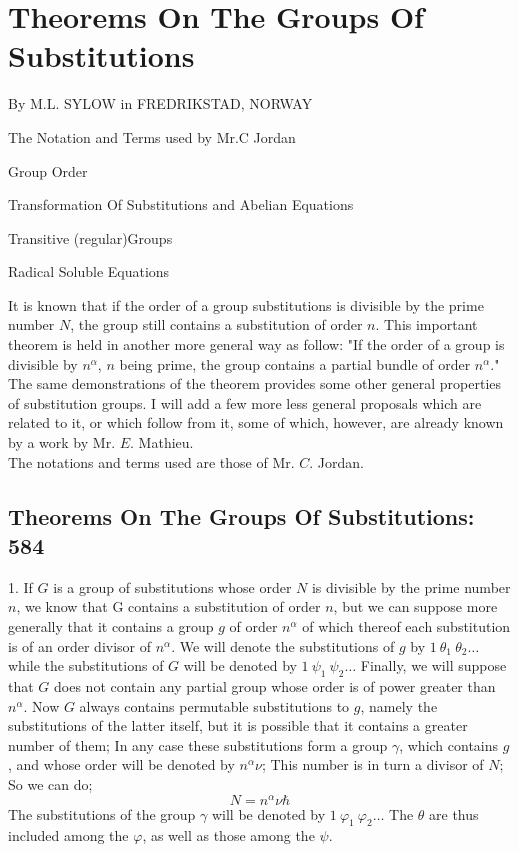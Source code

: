 \documentclass[11pt,fancy]{elegantbook}
\begin{document}
\chapter{Theorems On The Groups Of Substitutions}

\begin{introduction}
\item By M.L. SYLOW in FREDRIKSTAD, NORWAY
\item The Notation and Terms used by Mr.C Jordan
\item Group Order
\item Transformation Of Substitutions and Abelian Equations
\item Transitive (regular)Groups
\item Radical Soluble Equations
\end{introduction}

It is known that if the order of a group substitutions is divisible by the prime number $N$, the group still contains a substitution of order $n$. This important theorem is held in another more general way as follow: "If the order of a group is divisible by ${n^\alpha}$, $n$ being prime, the group contains a partial bundle of order $n^\alpha$." The same demonstrations of the theorem provides some other general properties of substitution groups. I will add a few more less general proposals which are related to it, or which follow from it, some of which, however, are already known by a work by Mr. $E$. Mathieu. \\
The notations and terms used are those of Mr. $C$. Jordan.

\section{Theorems On The Groups Of Substitutions: 584}

1. 
If $G$ is a group of substitutions whose order $N$ is divisible by the prime number $n$, we know that G contains a substitution of order $n$, but we can suppose more generally that it contains a group $g$ of order $n^\alpha$ of which thereof each substitution is of an order divisor of $n^\alpha$. We will denote the substitutions of $g$ by $1 \ \theta_1 \ \theta_2 \dots$ while the substitutions of $G$ will be denoted by $1 \  \psi_1  \ \psi_2 \dots$
Finally, we will suppose that $G$ does not contain any partial group whose order is of power greater than $n^\alpha$. Now $G$ always contains permutable substitutions to $g$, namely the substitutions of the latter itself, but it is possible that it contains a greater number of them; In any case these substitutions form a group $\gamma$, which contains $g$, and whose order will be denoted by $n^\alpha\nu$; This number is in turn a divisor of $N$; So we can do; 
\begin{equation}
    N = n^\alpha\nu \hbar
\end{equation}
The substitutions of the group $\gamma$ will be denoted by $1 \ \varphi_1 \ \varphi_2\dots$
The $\theta$ are thus included among the $\varphi$, as well as those among the $\psi$.
\end{document}
